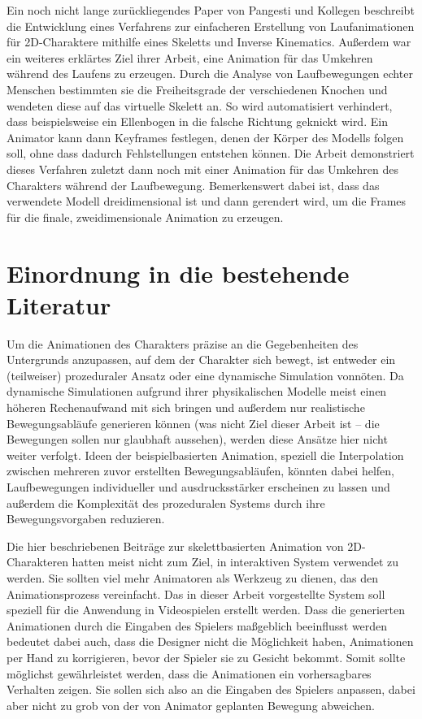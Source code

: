 Ein noch nicht lange zurückliegendes Paper von Pangesti und Kollegen\cite{pangesti2019analysis} beschreibt die Entwicklung eines Verfahrens zur einfacheren Erstellung von Laufanimationen für 2D-Charaktere mithilfe eines Skeletts und Inverse Kinematics. Außerdem war ein weiteres erklärtes Ziel ihrer Arbeit, eine Animation für das Umkehren während des Laufens zu erzeugen. Durch die Analyse von Laufbewegungen echter Menschen bestimmten sie die Freiheitsgrade der verschiedenen Knochen und wendeten diese auf das virtuelle Skelett an. So wird automatisiert verhindert, dass beispielsweise ein Ellenbogen in die falsche Richtung geknickt wird. Ein Animator kann dann Keyframes festlegen, denen der Körper des Modells folgen soll, ohne dass dadurch Fehlstellungen entstehen können. Die Arbeit demonstriert dieses Verfahren zuletzt dann noch mit einer Animation für das Umkehren des Charakters während der Laufbewegung. Bemerkenswert dabei ist, dass das verwendete Modell dreidimensional ist und dann gerendert wird, um die Frames für die finale, zweidimensionale Animation zu erzeugen.


\section{Einordnung in die bestehende Literatur}
Um die Animationen des Charakters präzise an die Gegebenheiten des Untergrunds anzupassen, auf dem der Charakter sich bewegt, ist entweder ein (teilweiser) prozeduraler Ansatz oder eine dynamische Simulation vonnöten. Da dynamische Simulationen aufgrund ihrer physikalischen Modelle meist einen höheren Rechenaufwand mit sich bringen und außerdem nur realistische Bewegungsabläufe generieren können (was nicht Ziel dieser Arbeit ist – die Bewegungen sollen nur glaubhaft aussehen), werden diese Ansätze hier nicht weiter verfolgt. Ideen der beispielbasierten Animation, speziell die Interpolation zwischen mehreren zuvor erstellten Bewegungsabläufen, könnten dabei helfen, Laufbewegungen individueller und ausdrucksstärker erscheinen zu lassen und außerdem die Komplexität des prozeduralen Systems durch ihre Bewegungsvorgaben reduzieren.

Die hier beschriebenen Beiträge zur skelettbasierten Animation von 2D-Charakteren hatten meist nicht zum Ziel, in interaktiven System verwendet zu werden. Sie sollten viel mehr Animatoren als Werkzeug zu dienen, das den Animationsprozess vereinfacht. Das in dieser Arbeit vorgestellte System soll speziell für die Anwendung in Videospielen erstellt werden. Dass die generierten Animationen durch die Eingaben des Spielers maßgeblich beeinflusst werden bedeutet dabei auch, dass die Designer nicht die Möglichkeit haben, Animationen per Hand zu korrigieren, bevor der Spieler sie zu Gesicht bekommt. Somit sollte möglichst gewährleistet werden, dass die Animationen ein vorhersagbares Verhalten zeigen. Sie sollen sich also an die Eingaben des Spielers anpassen, dabei aber nicht zu grob von der von Animator geplanten Bewegung abweichen.


